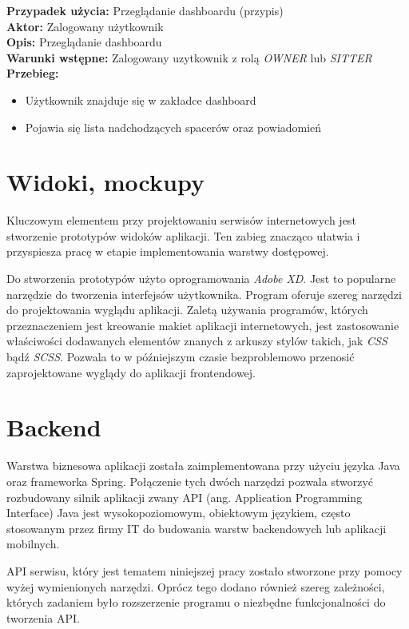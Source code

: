 \noindent
\textbf{Przypadek użycia:} Przeglądanie dashboardu (przypis)\\
\textbf{Aktor:} Zalogowany użytkownik\\
\textbf{Opis:} Przeglądanie dashboardu\\
\textbf{Warunki wstępne:} Zalogowany uzytkownik z rolą \textit{OWNER} lub \textit{SITTER}\\
\textbf{Przebieg:}
\begin{itemize}
    \item Użytkownik znajduje się w zakładce dashboard
    \item Pojawia się lista nadchodzących spacerów oraz powiadomień
\end{itemize}

\section{Widoki, mockupy}
Kluczowym elementem przy projektowaniu serwisów internetowych jest stworzenie prototypów widoków aplikacji. Ten zabieg znacząco ułatwia i przyspiesza pracę w etapie implementowania warstwy dostępowej. 

Do stworzenia prototypów użyto oprogramowania \textit{Adobe XD}. Jest to popularne narzędzie do tworzenia interfejsów użytkownika. Program oferuje szereg narzędzi do projektowania wyglądu aplikacji. Zaletą używania programów, których przeznaczeniem jest kreowanie makiet aplikacji internetowych, jest zastosowanie właściwości dodawanych elementów znanych z arkuszy stylów takich, jak \textit{CSS} bądź \textit{SCSS}. Pozwala to w późniejszym czasie bezproblemowo przenosić zaprojektowane wyglądy do aplikacji frontendowej.
\section{Backend}
Warstwa biznesowa aplikacji została zaimplementowana przy użyciu języka Java oraz frameworka Spring. Połączenie tych dwóch narzędzi pozwala stworzyć rozbudowany silnik aplikacji zwany API (ang. Application Programming Interface)
Java jest wysokopoziomowym, obiektowym językiem, często stosowanym przez firmy IT do budowania warstw backendowych lub aplikacji mobilnych. 

API serwisu, który jest tematem niniejszej pracy zostało stworzone przy pomocy wyżej wymienionych narzędzi. Oprócz tego dodano również szereg zależności, których zadaniem było rozszerzenie programu o niezbędne funkcjonalności do tworzenia API.

